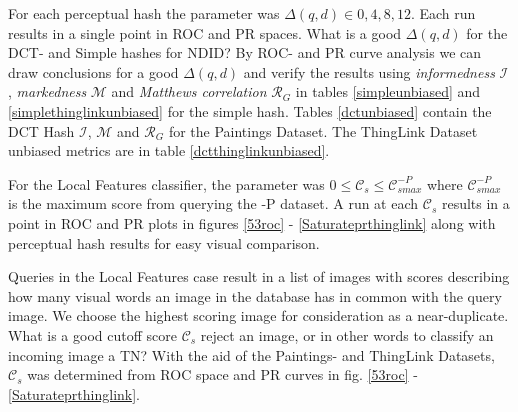 \documentclass[english,12pt,a4paper,pdftex,elec,utf8, table]{aaltothesis}
\begin{document}
For each perceptual hash the parameter was $\Delta(q,d) \in {0,4,8,12}$. Each run results in a single point in ROC and PR spaces. What is a good $\Delta(q,d)$ for the DCT- and Simple hashes for NDID? By ROC- and PR curve analysis we can draw conclusions for a good $\Delta(q,d)$ and verify the results using \emph{informedness} $\mathcal{I}$, \emph{markedness} $\mathcal{M}$ and \emph{Matthews correlation} $\mathcal{R}_G$ in tables \ref{simpleunbiased} and \ref{simplethinglinkunbiased} for the simple hash. Tables \ref{dctunbiased} contain the DCT Hash $\mathcal{I}$, $\mathcal{M}$ and $\mathcal{R}_G$ for the Paintings Dataset. The ThingLink Dataset unbiased metrics are in table \ref{dctthinglinkunbiased}.

For the Local Features classifier, the parameter was $0 \leq \mathcal{C}_s \leq \mathcal{C}_{smax}^{-P}$ where $\mathcal{C}_{smax}^{-P}$ is the maximum score from querying the -P dataset. A run at each $\mathcal{C}_s$ results in a point in ROC and PR plots in figures \ref{53roc} - \ref{Saturateprthinglink} along with perceptual hash results for easy visual comparison.

Queries in the Local Features case result in a list of images with scores describing how many visual words an image in the database has in common with the query image. We choose the highest scoring image for consideration as a near-duplicate. What is a good cutoff score $\mathcal{C}_s$ reject an image, or in other words to classify an incoming image a TN? With the aid of the Paintings- and ThingLink Datasets, $\mathcal{C}_s$ was determined from ROC space and PR curves in fig. \ref{53roc} - \ref{Saturateprthinglink}.
\end{document}
